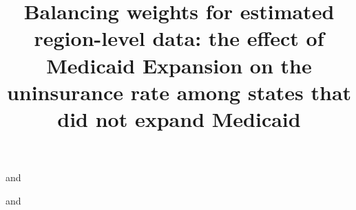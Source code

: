 \documentclass[aoas]{imsart}
\theoremstyle{plain}
\theoremstyle{remark}
\begin{document}
\begin{frontmatter}
\title{Balancing weights for estimated region-level data: the effect of Medicaid Expansion on the uninsurance rate among states that did not expand Medicaid}

\begin{aug}
\author[A]{ } and
\author[A]{ } and
\author[A]{ }
\address[A]{Carnegie Mellon University, Heinz College and Department of Statistics and Data Science }

\end{aug}


\end{frontmatter}
\end{document}
